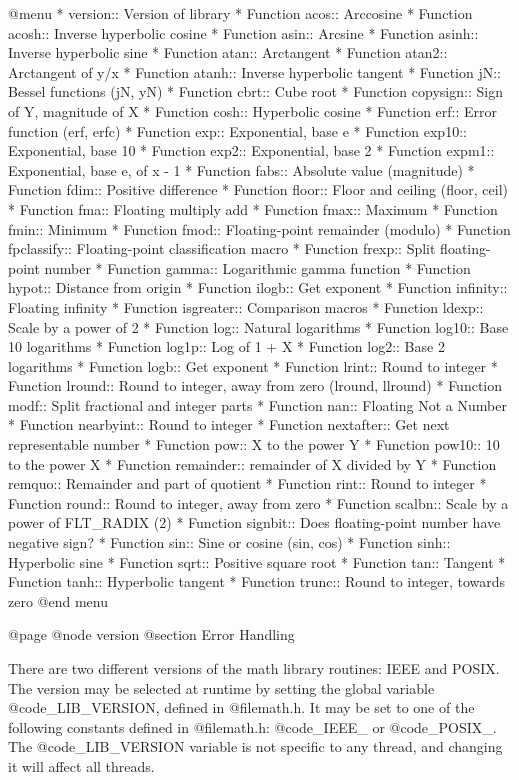 @menu
* version::	Version of library
* Function acos::	Arccosine
* Function acosh::	Inverse hyperbolic cosine
* Function asin::	Arcsine
* Function asinh::	Inverse hyperbolic sine
* Function atan::	Arctangent
* Function atan2::	Arctangent of y/x
* Function atanh::	Inverse hyperbolic tangent
* Function jN::	        Bessel functions (jN, yN)
* Function cbrt::	Cube root
* Function copysign::	Sign of Y, magnitude of X
* Function cosh::	Hyperbolic cosine
* Function erf::		Error function (erf, erfc)
* Function exp::		Exponential, base e
* Function exp10::	Exponential, base 10
* Function exp2::	Exponential, base 2
* Function expm1::	Exponential, base e, of x - 1
* Function fabs::	Absolute value (magnitude)
* Function fdim::	Positive difference
* Function floor::	Floor and ceiling (floor, ceil)
* Function fma::		Floating multiply add
* Function fmax::	Maximum
* Function fmin::	Minimum
* Function fmod::	Floating-point remainder (modulo)
* Function fpclassify::	Floating-point classification macro
* Function frexp::	Split floating-point number
* Function gamma::	Logarithmic gamma function
* Function hypot::	Distance from origin
* Function ilogb::	Get exponent
* Function infinity::	Floating infinity
* Function isgreater::	Comparison macros
* Function ldexp::	Scale by a power of 2
* Function log::		Natural logarithms
* Function log10::	Base 10 logarithms
* Function log1p::	Log of 1 + X
* Function log2::	Base 2 logarithms
* Function logb::	Get exponent
* Function lrint::	Round to integer
* Function lround::	Round to integer, away from zero (lround, llround)
* Function modf::	Split fractional and integer parts
* Function nan::		Floating Not a Number
* Function nearbyint::	Round to integer
* Function nextafter::	Get next representable number
* Function pow::		X to the power Y
* Function pow10::	10 to the power X
* Function remainder::	remainder of X divided by Y
* Function remquo::	Remainder and part of quotient
* Function rint::	Round to integer
* Function round::	Round to integer, away from zero
* Function scalbn::	Scale by a power of FLT_RADIX (2)
* Function signbit::	Does floating-point number have negative sign?
* Function sin::		Sine or cosine (sin, cos)
* Function sinh::	Hyperbolic sine
* Function sqrt::	Positive square root
* Function tan::		Tangent
* Function tanh::	Hyperbolic tangent
* Function trunc::	Round to integer, towards zero
@end menu

@page
@node version
@section Error Handling

There are two different versions of the math library routines: IEEE
and POSIX.  The version may be selected at runtime by
setting the global variable @code{_LIB_VERSION}, defined in
@file{math.h}.  It may be set to one of the following constants defined
in @file{math.h}: @code{_IEEE_} or @code{_POSIX_}.
The @code{_LIB_VERSION} variable is not specific to any
thread, and changing it will affect all threads.

